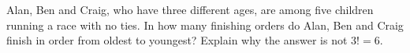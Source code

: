 Alan, Ben and Craig, who have three different ages, are among five children running a race with no ties. In how many finishing orders do Alan, Ben and Craig finish in order from oldest to youngest? Explain why the answer is not $3!=6$.
